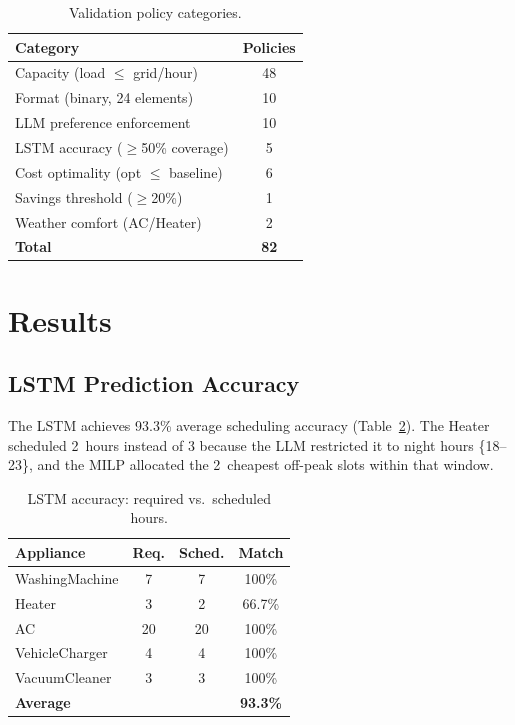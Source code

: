 \documentclass[10pt,a4paper,twocolumn]{article}
\begin{document}
\begin{table}[H]
    \centering
    \caption{Validation policy categories.}
    \label{tab:policies}
    \small
    \begin{tabular}{@{}lc@{}}
        \toprule
        \textbf{Category} & \textbf{Policies} \\
        \midrule
        Capacity (load $\leq$ grid/hour) & 48 \\
        Format (binary, 24 elements) & 10 \\
        LLM preference enforcement & 10 \\
        LSTM accuracy ($\geq$50\% coverage) & 5 \\
        Cost optimality (opt $\leq$ baseline) & 6 \\
        Savings threshold ($\geq$20\%) & 1 \\
        Weather comfort (AC/Heater) & 2 \\
        \midrule
        \textbf{Total} & \textbf{82} \\
        \bottomrule
    \end{tabular}
\end{table}

\section{Results}

\subsection{LSTM Prediction Accuracy}
The LSTM achieves 93.3\% average scheduling accuracy (Table~\ref{tab:lstm}). The Heater scheduled 2~hours instead of 3 because the LLM restricted it to night hours \{18--23\}, and the MILP allocated the 2~cheapest off-peak slots within that window.

\begin{table}[H]
    \centering
    \caption{LSTM accuracy: required vs.\ scheduled hours.}
    \label{tab:lstm}
    \small
    \begin{tabular}{@{}lccc@{}}
        \toprule
        \textbf{Appliance} & \textbf{Req.} & \textbf{Sched.} & \textbf{Match} \\
        \midrule
        WashingMachine & 7  & 7  & 100\% \\
        Heater         & 3  & 2  & 66.7\% \\
        AC             & 20 & 20 & 100\% \\
        VehicleCharger & 4  & 4  & 100\% \\
        VacuumCleaner  & 3  & 3  & 100\% \\
        \midrule
        \textbf{Average} & & & \textbf{93.3\%} \\
        \bottomrule
    \end{tabular}
\end{table}
\end{document}
